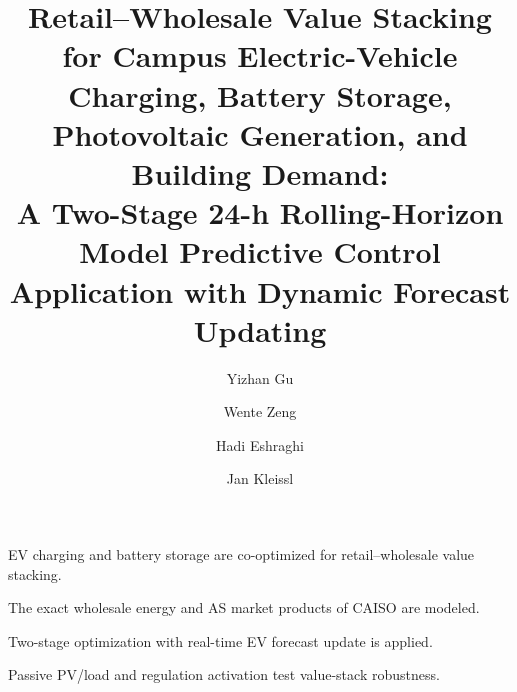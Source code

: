 \documentclass[final,5p,times]{elsarticle}
\begin{document}
\begin{frontmatter}

\title{Retail--Wholesale Value Stacking for Campus Electric-Vehicle Charging, Battery Storage, Photovoltaic Generation, and Building Demand: \\
A Two-Stage 24-h Rolling-Horizon Model Predictive Control Application with Dynamic Forecast Updating}

\author[ucsd]{Yizhan Gu}
\author[totalenergies]{Wente Zeng}
\author[totalenergies]{Hadi Eshraghi}
\author[ucsd]{Jan Kleissl}


\begin{highlights}
\item EV charging and battery storage are co-optimized for retail--wholesale value stacking.
\item The exact wholesale energy and AS market products of CAISO are modeled.
\item Two-stage optimization with real-time  EV forecast update is applied.
\item Passive PV/load and regulation activation test value-stack robustness.
\end{highlights}


\end{frontmatter}
\end{document}
